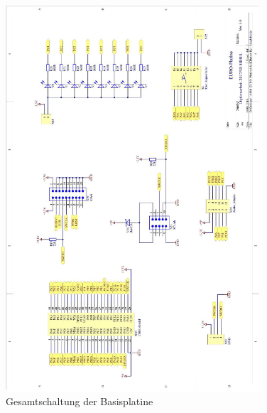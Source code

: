 \begin{figure}[H]\ContinuedFloat
    \centering
    \includegraphics[width=0.85\textwidth]{Schuh/Pictures/Basis-Schaltung4}
    \caption[Gesamtschaltung der Basisplatine]{Gesamtschaltung der \gls{Basisplatine}}
\end{figure}
